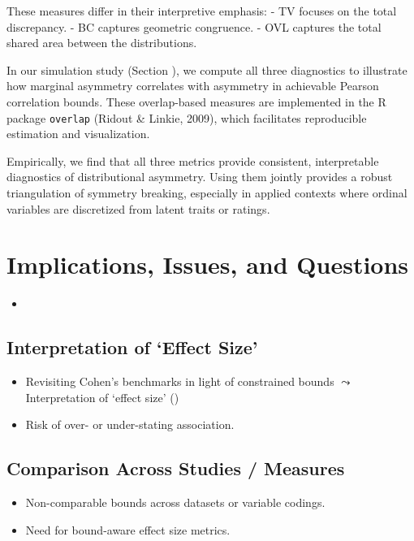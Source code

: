 \documentclass[
  12pt,
]{article}
\providecommand{\tightlist}{%
  \setlength{\itemsep}{0pt}\setlength{\parskip}{0pt}}
\theoremstyle{plain}
\theoremstyle{definition}
\theoremstyle{remark}
\begin{document}
These measures differ in their interpretive emphasis: - TV focuses on
the total discrepancy. - BC captures geometric congruence. - OVL
captures the total shared area between the distributions.

In our simulation study (Section ), we compute all three diagnostics to
illustrate how marginal asymmetry correlates with asymmetry in
achievable Pearson correlation bounds. These overlap-based measures are
implemented in the R package \texttt{overlap} (Ridout \& Linkie, 2009),
which facilitates reproducible estimation and visualization.

Empirically, we find that all three metrics provide consistent,
interpretable diagnostics of distributional asymmetry. Using them
jointly provides a robust triangulation of symmetry breaking, especially
in applied contexts where ordinal variables are discretized from latent
traits or ratings.

\section{Implications, Issues, and
Questions}\label{implications-issues-and-questions}

\begin{itemize}
\tightlist
\item
\end{itemize}

\subsection{Interpretation of `Effect
Size'}\label{interpretation-of-effect-size}

\begin{itemize}
\tightlist
\item
  Revisiting Cohen's benchmarks in light of constrained bounds
  \(\leadsto\) Interpretation of `effect size'
  (\textcite{cohe02-applied})
\item
  Risk of over- or under-stating association.
\end{itemize}

\subsection{Comparison Across Studies /
Measures}\label{comparison-across-studies-measures}

\begin{itemize}
\tightlist
\item
  Non-comparable bounds across datasets or variable codings.
\item
  Need for bound-aware effect size metrics.
\end{itemize}
\end{document}
